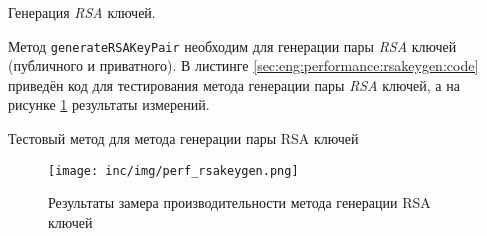 \subsubsection{} Генерация \textit{RSA} ключей.
\label{sec:eng:performance:rsakeygen}

Метод \texttt{generateRSAKeyPair} необходим для генерации пары \textit{RSA} ключей (публичного и приватного). В листинге \ref{sec:eng:performance:rsakeygen:code} приведён код для тестирования метода генерации пары \textit{RSA} ключей, а на рисунке \ref{sec:eng:performance:rsakeygen:result} результаты измерений.

\begin{code}
  
   \caption{Тестовый метод для метода генерации пары RSA ключей}
   \label{sec:eng:performance:rsakeygen:code}
\end{code}

\begin{figure}[h]
  \centering
    \texttt{[image: inc/img/perf\_rsakeygen.png]}
  \caption{Результаты замера производительности метода генерации RSA ключей}
  \label{sec:eng:performance:rsakeygen:result}
\end{figure}